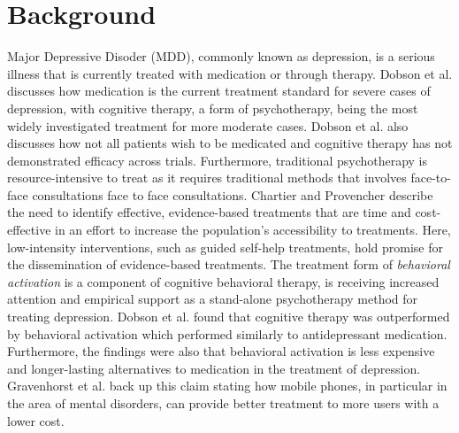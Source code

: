 \section{Background}


Major Depressive Disoder (MDD), commonly known as depression, is a serious illness that is currently treated with medication or through therapy. Dobson et al. \cite{randomized_trial_behavioural_activation} discusses how medication is the current treatment standard for severe cases of depression, with cognitive therapy, a form of psychotherapy, being the most widely investigated treatment for more moderate cases. Dobson et al. also discusses how not all patients wish to be medicated and cognitive therapy has not demonstrated efficacy across trials. Furthermore, traditional psychotherapy is resource-intensive to treat as it requires traditional methods that involves face-to-face consultations face to face consultations. Chartier and Provencher \cite{behavioural_activation_for_depression} describe the need to identify effective, evidence-based treatments that are time and cost-effective in an effort to increase the population's accessibility to treatments. Here, low-intensity interventions, such as guided self-help treatments, hold promise for the dissemination of evidence-based treatments. The treatment form of \textit{behavioral activation} is a component of cognitive behavioral therapy, is receiving increased attention and empirical support as a stand-alone psychotherapy method for treating depression. Dobson et al. found that cognitive therapy was outperformed by behavioral activation which performed similarly to antidepressant medication. Furthermore, the findings were also that behavioral activation is less expensive and longer-lasting alternatives to medication in the treatment of depression. Gravenhorst et al. \cite{Gravenhorst2015} back up this claim stating how mobile phones, in particular in the area of mental disorders, can provide better treatment to more users with a lower cost. \\

